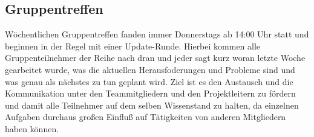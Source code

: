 \subsection{Gruppentreffen}
Wöchentlichen Gruppentreffen fanden immer Donnerstags ab 14:00 Uhr statt und beginnen in der Regel mit einer Update-Runde. Hierbei kommen alle Gruppenteilnehmer der Reihe nach dran und jeder sagt kurz woran letzte Woche gearbeitet wurde, was die aktuellen Herausfoderungen und Probleme sind und was genau als nächstes zu tun geplant wird. Ziel ist es den Austausch und die Kommunikation unter den Teammitgliedern und den Projektleitern zu fördern und damit alle Teilnehmer auf dem selben Wissenstand zu halten, da einzelnen Aufgaben durchaus großen Einfluß auf Tätigkeiten von anderen Mitgliedern haben können. \\